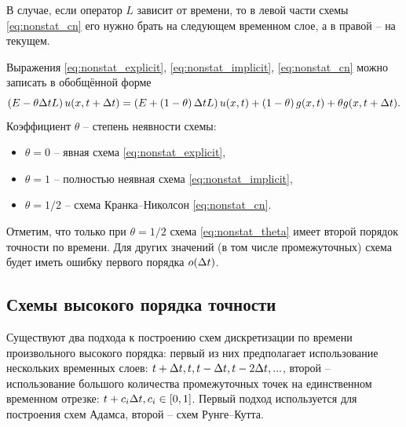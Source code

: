 В случае, если оператор $L$ зависит от времени, то
в левой части схемы \eqref{eq:nonstat_cn} его нужно
брать на следующем временном слое, а в правой -- на текущем.


Выражения
\eqref{eq:nonstat_explicit},
\eqref{eq:nonstat_implicit},
\eqref{eq:nonstat_cn}
можно записать в обобщённой форме
\begin{equation}
    \label{eq:nonstat_theta}
    \left(E-\theta\Delta t L\right) u(x, t+\Delta t) = \left(E + \left(1 - \theta\right)\Delta t L\right) u(x, t) + \left(1 - \theta\right) g(x, t) + \theta g(x, t + \Delta t).
\end{equation}
Коэффициент $\theta$ -- степень неявности схемы:
\begin{itemize}
\item $\theta = 0$ -- явная схема \eqref{eq:nonstat_explicit},
\item $\theta = 1$ -- полностью неявная схема \eqref{eq:nonstat_implicit},
\item $\theta = 1/2$ -- схема Кранка--Николсон \eqref{eq:nonstat_cn}.
\end{itemize}

Отметим, что только при $\theta = 1/2$ схема \eqref{eq:nonstat_theta} имеет второй порядок точности по времени.
Для других значений (в том числе промежуточных) схема будет иметь ошибку первого порядка $o(\Delta t)$.

\subsection{Схемы высокого порядка точности}
Существуют два подхода к построению схем дискретизации по времени произвольного высокого порядка:
первый из них предполагает использование нескольких временных слоев: $t+\Delta t, t, t-\Delta t, t-2\Delta t, ...$, второй -- использование
большого количества промежуточных точек на единственном временном отрезке: $t+c_i\Delta t, c_i\in[0, 1]$.
Первый подход используется для построения схем Адамса, второй -- схем Рунге--Кутта.

